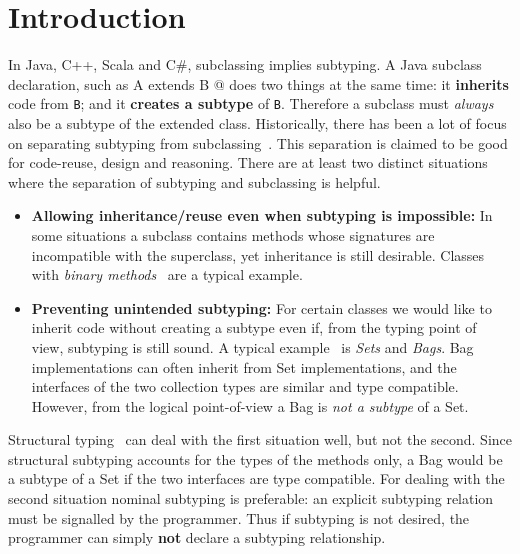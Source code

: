 \saveSpace
\section{Introduction}\label{sec:intro}
\saveSpace
In Java, C++, Scala and C\#, subclassing 
implies subtyping. A Java subclass declaration, such as 
\Q@class A extends B {}@
\noindent does two things at the same time:
it {\bf inherits} code from \lstinline{B}; and it {\bf creates
a subtype} of \lstinline{B}. Therefore a subclass must \emph{always} also be a subtype of the extended class.
Historically, there has been a lot of focus on
separating subtyping from subclassing~\cite{cook}.  This separation is claimed to be
good for code-reuse, design and reasoning. There are at
least two distinct situations where the separation of subtyping and 
subclassing is helpful.

\begin{itemize}

\item {\bf Allowing inheritance/reuse even when subtyping is impossible:} 
In some situations a subclass contains methods whose signatures 
are incompatible with the superclass, yet inheritance is still
desirable. Classes with \emph{binary methods}~\cite{cook,bruce96binary} are a typical example.

\item {\bf Preventing unintended subtyping:} For certain classes we
  would like to inherit code without creating a subtype even if, from
  the typing point of view, subtyping is still sound. A typical
  example~\cite{LaLonde:1991:SSS:110673.110679} is \emph{Sets} and
  \emph{Bags}. Bag implementations can often inherit 
  from Set implementations, and the interfaces of the two collection types are
  similar and type compatible. 
  However, from the logical point-of-view a Bag is \emph{not a
    subtype} of a Set. 

\end{itemize}

\noindent Structural typing~\cite{cook} can deal with the first
situation well, but not the second. Since structural subtyping
accounts for the types of the methods only, a Bag would be a subtype
of a Set if the two interfaces are type compatible. For dealing with
the second situation nominal subtyping is preferable: an explicit subtyping relation must be signalled by the programmer. Thus if subtyping is not desired, the
programmer can simply {\bf not} declare a subtyping relationship.

